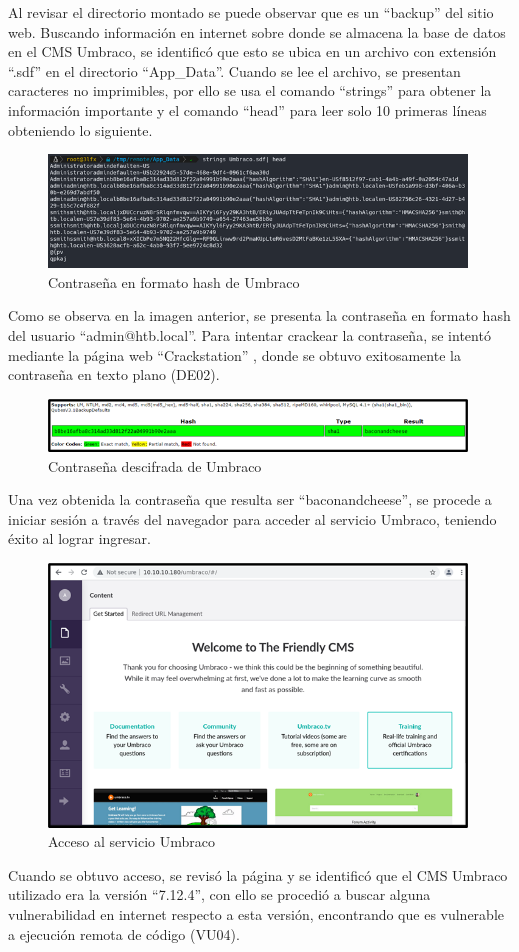 Al revisar el directorio montado se puede observar que es un “backup” del sitio web. Buscando información en internet sobre donde se almacena la base de datos en el CMS Umbraco, se identificó que esto se ubica en un archivo con extensión “.sdf” en el directorio “App\_Data”. Cuando se lee el archivo, se presentan caracteres no imprimibles, por ello se usa el comando “strings” para obtener la información importante y el comando “head” para leer solo 10 primeras líneas obteniendo lo siguiente.
\begin{figure}[H]
    \centering
    \includegraphics[width=0.99\textwidth]{imagenes/conumb.png}
    \caption{Contraseña en formato hash de Umbraco}
\end{figure}
Como se observa en la imagen anterior, se presenta la contraseña en formato hash del usuario “admin@htb.local”. Para intentar crackear la contraseña, se intentó mediante la página web “Crackstation” \cite{crack}, donde se obtuvo exitosamente la contraseña en texto plano (DE02).
\begin{figure}[H]
    \centering
    \includegraphics[width=0.99\textwidth]{imagenes/desumb.png}
    \caption{Contraseña descifrada de Umbraco}
\end{figure}
Una vez obtenida la contraseña que resulta ser “baconandcheese”, se procede a iniciar sesión a través del navegador para acceder al servicio Umbraco, teniendo éxito al lograr ingresar.
\begin{figure}[H]
    \centering
    \includegraphics[width=0.99\textwidth]{imagenes/acumb.png}
    \caption{Acceso al servicio Umbraco}
\end{figure}
Cuando se obtuvo acceso, se revisó la página y se identificó que el CMS Umbraco utilizado era la versión “7.12.4”, con ello se procedió a buscar alguna vulnerabilidad en internet respecto a esta versión, encontrando que es vulnerable a ejecución remota de código (VU04).

